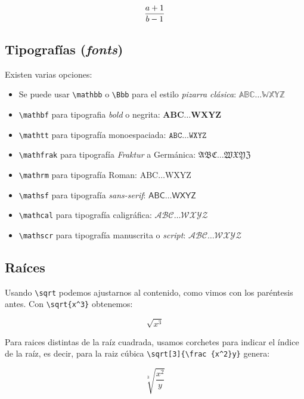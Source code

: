 \documentclass[11pt]{article}
\begin{document}
\[ {a+1\over b-1} \]

    \subsection{\texorpdfstring{Tipografías
(\emph{fonts})}{Tipografías (fonts)}}\label{tipografuxedas-fonts}

Existen varias opciones:

\begin{itemize}
\item
  Se puede usar \texttt{\textbackslash{}mathbb} o
  \texttt{\textbackslash{}Bbb} para el estilo \emph{pizarra clásica}:
  \(\mathbb{ABC\ldots WXYZ}\)
\item
  \texttt{\textbackslash{}mathbf} para tipografia \emph{bold} o negrita:
  \(\mathbf{ABC\ldots WXYZ}\)
\item
  \texttt{\textbackslash{}mathtt} para tipografía monoespaciada:
  \(\mathtt{ABC\ldots WXYZ}\)
\item
  \texttt{\textbackslash{}mathfrak} para tipografía \emph{Fraktur} a
  Germánica: \(\mathfrak{ABC\ldots WXYZ}\)
\item
  \texttt{\textbackslash{}mathrm} para tipografía Roman:
  \(\mathrm{ABC\ldots WXYZ}\)
\item
  \texttt{\textbackslash{}mathsf} para tipografía \emph{sans-serif}:
  \(\mathsf{ABC\ldots WXYZ}\)
\item
  \texttt{\textbackslash{}mathcal} para tipografía caligráfica:
  \(\mathcal{ABC\ldots WXYZ}\)
\item
  \texttt{\textbackslash{}mathscr} para tipografía manuscrita o
  \emph{script}: \(\mathscr{ABC\ldots WXYZ}\)
\end{itemize}

    \subsection{Raíces}\label{rauxedces}

Usando \texttt{\textbackslash{}sqrt} podemos ajustarnos al contenido,
como vimos con los paréntesis antes. Con
\texttt{\textbackslash{}sqrt\{x\^{}3\}} obtenemos:

\[ \sqrt{x^3} \]

Para raices distintas de la raíz cuadrada, usamos corchetes para indicar
el índice de la raíz, es decir, para la raiz cúbica
\texttt{\textbackslash{}sqrt{[}3{]}\{\textbackslash{}frac\ \{x\^{}2\}y\}}
genera:

\[ \sqrt[3]{\frac {x^2}y} \]
\end{document}
